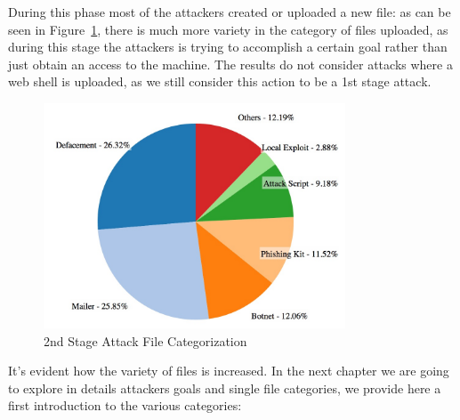 During this phase most of the attackers created or uploaded a new file: as can be seen in Figure~\ref{fig:2ndStageAttack}, there is much more variety in the category of files uploaded, as during this stage the attackers is trying to accomplish a certain goal rather than just obtain an access to the machine. The results do not consider attacks where a web shell is uploaded, as we still consider this action to be a 1st stage attack.

\begin{figure}[tbh]
\centerline{\includegraphics[width=0.8\textwidth]{Images/2ndStageAttack.jpg}}
\caption{2nd Stage Attack File Categorization\label{fig:2ndStageAttack}}
\end{figure}

It's evident how the variety of files is increased. In the next chapter we are going to explore in details attackers goals and single file categories, we provide here a first introduction to the various categories:

